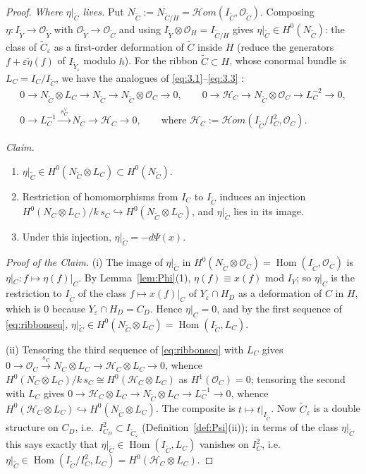 \documentclass[11pt,reqno]{amsart}
\theoremstyle{plain}
\theoremstyle{definition}
\newcommand{\OO}{\mathcal{O}}
\newcommand{\sHom}{\mathcal{H}om}
\newcommand{\Hom}{\operatorname{Hom}}
\newcommand{\Yt}{\widetilde{Y}}
\newcommand{\Ct}{\widetilde{C}}
\newcommand{\Hc}{\mathcal{H}}
\newcommand{\Dd}{D}
\begin{document}
\begin{proof}
\emph{Where $\eta|_{\Ct}$ lives.} Put $N_{\Ct}:=N_{\Ct/H}=\sHom(I_{\Ct},\OO_{\Ct})$. Composing $\eta\colon I_{\Yt}\to\OO_{\Yt}$ with $\OO_{\Yt}\to\OO_{\Ct}$ and using $I_{\Yt}\otimes\OO_H=I_{\Ct/H}$ gives $\eta|_{\Ct}\in H^0(N_{\Ct})$: the class of $\Ct_\varepsilon$ as a first-order deformation of $\Ct$ inside $H$ (reduce the generators $f+\varepsilon\tilde\eta(f)$ of $I_{\Yt_\varepsilon}$ modulo $h$). For the ribbon $\Ct\subset H$, whose conormal bundle is $L_C=I_C/I_{\Ct}$, we have the analogues of \eqref{eq:3.1}--\eqref{eq:3.3} \cite[Lemma~4.1]{GGP08}:
\begin{equation}\label{eq:ribbonseq}
\begin{gathered}
0\to N_{\Ct}\otimes L_C\to N_{\Ct}\to N_{\Ct}\otimes\OO_C\to0,\qquad
0\to\Hc_C\to N_{\Ct}\otimes\OO_C\to L_C^{-2}\to0,\\
0\to L_C^{-1}\xrightarrow{\ s_C^{\vee}\ }N_C\to\Hc_C\to0,\qquad\text{where }\Hc_C:=\sHom(I_{\Ct}/I_C^2,\OO_C).
\end{gathered}
\end{equation}

\emph{Claim.}
\begin{enumerate}
\item[(i)] $\eta|_{\Ct}\in H^0(N_{\Ct}\otimes L_C)\subset H^0(N_{\Ct})$.
\item[(ii)] Restriction of homomorphisms from $I_C$ to $I_{\Ct}$ induces an injection $H^0(N_C\otimes L_C)/k\,s_C\hookrightarrow H^0(N_{\Ct}\otimes L_C)$, and $\eta|_{\Ct}$ lies in its image.
\item[(iii)] Under this injection, $\eta|_{\Ct}=-d\Psi(x)$.
\end{enumerate}

\emph{Proof of the Claim.} (i) The image of $\eta|_{\Ct}$ in $H^0(N_{\Ct}\otimes\OO_C)=\Hom(I_{\Ct},\OO_C)$ is $\eta|_C\colon f\mapsto\eta(f)|_C$. By Lemma~\ref{lem:Phi}(1), $\eta(f)\equiv x(f)$ mod $I_Y$; so $\eta|_C$ is the restriction to $I_{\Ct}$ of the class $f\mapsto x(f)|_C$ of $Y_\varepsilon\cap H_\Dd$ as a deformation of $C$ in $H$, which is $0$ because $Y_\varepsilon\cap H_\Dd=C_\Dd$. Hence $\eta|_C=0$, and by the first sequence of \eqref{eq:ribbonseq}, $\eta|_{\Ct}\in H^0(N_{\Ct}\otimes L_C)=\Hom(I_{\Ct},L_C)$.

(ii) Tensoring the third sequence of \eqref{eq:ribbonseq} with $L_C$ gives $0\to\OO_C\xrightarrow{s_C}N_C\otimes L_C\to\Hc_C\otimes L_C\to0$, whence $H^0(N_C\otimes L_C)/k\,s_C\cong H^0(\Hc_C\otimes L_C)$ as $H^1(\OO_C)=0$; tensoring the second with $L_C$ gives $0\to\Hc_C\otimes L_C\to N_{\Ct}\otimes L_C\to L_C^{-1}\to0$, whence $H^0(\Hc_C\otimes L_C)\hookrightarrow H^0(N_{\Ct}\otimes L_C)$. The composite is $t\mapsto t|_{I_{\Ct}}$. Now $\Ct_\varepsilon$ is a double structure on $C_\Dd$, i.e.\ $I_{C_\Dd}^2\subset I_{\Ct_\varepsilon}$ (Definition~\ref{def:Psi}(ii)); in terms of the class $\eta|_{\Ct}$ this says exactly that $\eta|_{\Ct}\in\Hom(I_{\Ct},L_C)$ vanishes on $I_C^2$, i.e.\ $\eta|_{\Ct}\in\Hom(I_{\Ct}/I_C^2,L_C)=H^0(\Hc_C\otimes L_C)$.


\end{proof}
\end{document}
